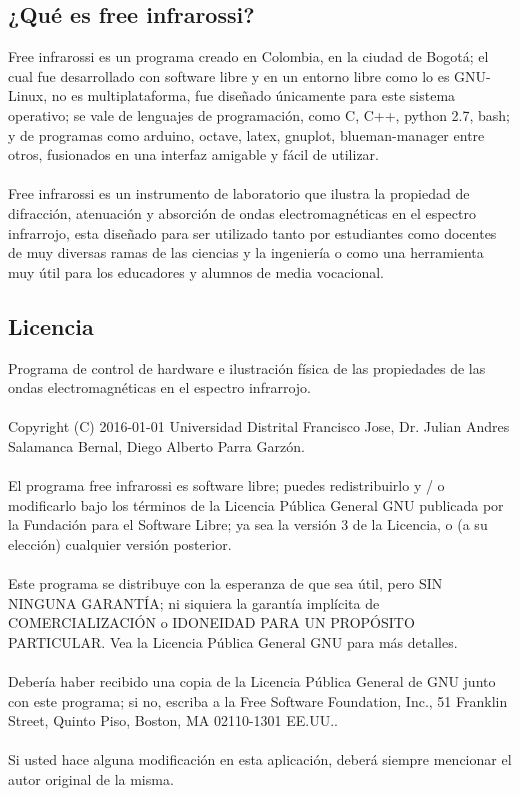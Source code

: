 \documentclass[12]{article}
\begin{document}
\begin{multicols}{2}
\subsection{¿Qué es free infrarossi?}
Free infrarossi es un  programa creado en Colombia, en la ciudad de Bogotá; el cual fue desarrollado con software libre y en un entorno libre como lo es GNU-Linux, no es multiplataforma, fue diseñado únicamente para este sistema operativo; se vale de lenguajes de programación, como  C, C++, python 2.7, bash; y de programas como arduino, octave, latex, gnuplot, blueman-manager entre otros, fusionados en una interfaz amigable y fácil de utilizar. \\\\
Free infrarossi es un instrumento de laboratorio que ilustra  la propiedad de difracción, atenuación y absorción de ondas electromagnéticas en el espectro infrarrojo, esta diseñado para ser utilizado tanto por  estudiantes como docentes de muy diversas ramas de las ciencias y  la ingeniería o como una herramienta muy útil para los educadores y alumnos de media vocacional.
\subsection{Licencia}
Programa de control de hardware e ilustración física de las propiedades de las ondas electromagnéticas en el espectro infrarrojo.\\\\
Copyright (C) 2016-01-01  Universidad Distrital Francisco Jose, Dr. Julian Andres Salamanca Bernal, Diego Alberto Parra Garzón. \\\\
El programa free infrarossi es software libre; puedes redistribuirlo y / o modificarlo bajo los términos de la Licencia Pública General GNU publicada por la Fundación para el Software Libre; ya sea 	la versión 3 de la Licencia, o (a su elección) cualquier versión posterior. \\\\
Este programa se distribuye con la esperanza de que sea útil, pero SIN NINGUNA GARANTÍA; ni siquiera la garantía implícita de COMERCIALIZACIÓN o IDONEIDAD PARA UN PROPÓSITO PARTICULAR. Vea la Licencia Pública General GNU para más detalles. \\\\
Debería haber recibido una copia de la Licencia Pública General de GNU junto con este programa; si no, escriba a la Free Software Foundation, Inc., 51 Franklin Street, Quinto Piso, Boston, MA 02110-1301 EE.UU..\\\\
Si usted hace alguna modificación en esta aplicación, deberá siempre mencionar el autor original de la misma.

\end{multicols}
\end{document}

